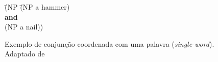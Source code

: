 \begin{figure}[!h]
    \centering
    \begin{minipage}{10cm}
        \begin{tabbing}
            \=(NP \=(NP a hammer)\+\\
            \>\textbf{and}\\
            \>(NP a nail))\\
        \end{tabbing}
    \end{minipage}
    \caption[Exemplo de conjunção coordenada (\textit{single-word})]{Exemplo de conjunção coordenada com uma palavra (\textit{single-word}). Adaptado de }
    \label{fig:ptb_conj_exe_1}
\end{figure}